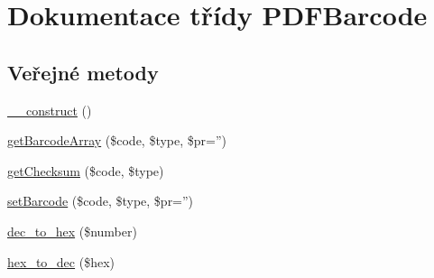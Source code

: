 \hypertarget{class_p_d_f_barcode}{\section{Dokumentace třídy P\-D\-F\-Barcode}
\label{class_p_d_f_barcode}
}
\subsection*{Veřejné metody}
\begin{DoxyCompactItemize}
\item 
\hyperlink{class_p_d_f_barcode_ade9c6a8f24d811e8e1174a6c2fa4d476}{\-\_\-\-\_\-construct} ()
\item 
\hyperlink{class_p_d_f_barcode_acb20e525d0e557f1fa6996ec29b155a6}{get\-Barcode\-Array} (\$code, \$type, \$pr='')
\item 
\hyperlink{class_p_d_f_barcode_ab0a15e493bc4ebe6e4ffdf2d662e519c}{get\-Checksum} (\$code, \$type)
\item 
\hyperlink{class_p_d_f_barcode_a831825af3ab302a5a8df3942cfa53c2b}{set\-Barcode} (\$code, \$type, \$pr='')
\item 
\hyperlink{class_p_d_f_barcode_a276149f08904f8cf031740bb82f507f7}{dec\-\_\-to\-\_\-hex} (\$number)
\item 
\hyperlink{class_p_d_f_barcode_ab805f4afb580f9ff9e0ef36835675dea}{hex\-\_\-to\-\_\-dec} (\$hex)
\end{DoxyCompactItemize}
